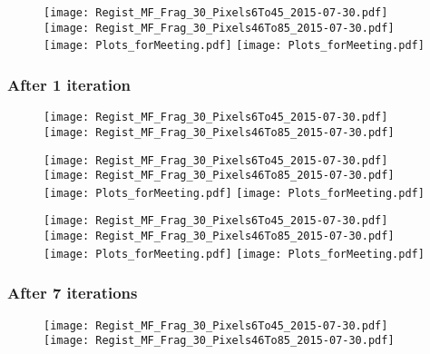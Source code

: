 \documentclass[10pt,dvipsnames,table]{beamer}
\begin{document}
\begin{frame}
\begin{figure}
\texttt{[image: Regist\_MF\_Frag\_30\_Pixels6To45\_2015-07-30.pdf]}
\texttt{[image: Regist\_MF\_Frag\_30\_Pixels46To85\_2015-07-30.pdf]} \\
\texttt{[image: Plots\_forMeeting.pdf]}
\texttt{[image: Plots\_forMeeting.pdf]}
\end{figure}
\end{frame}

\begin{frame}
\frametitle{After 1 iteration}
\begin{figure}
\texttt{[image: Regist\_MF\_Frag\_30\_Pixels6To45\_2015-07-30.pdf]}
\texttt{[image: Regist\_MF\_Frag\_30\_Pixels46To85\_2015-07-30.pdf]} \\
\end{figure}
\end{frame}

\begin{frame}
\begin{figure}
\texttt{[image: Regist\_MF\_Frag\_30\_Pixels6To45\_2015-07-30.pdf]}
\texttt{[image: Regist\_MF\_Frag\_30\_Pixels46To85\_2015-07-30.pdf]} \\
\texttt{[image: Plots\_forMeeting.pdf]}
\texttt{[image: Plots\_forMeeting.pdf]}
\end{figure}
\end{frame}

\begin{frame}
\begin{figure}
\texttt{[image: Regist\_MF\_Frag\_30\_Pixels6To45\_2015-07-30.pdf]}
\texttt{[image: Regist\_MF\_Frag\_30\_Pixels46To85\_2015-07-30.pdf]} \\
\texttt{[image: Plots\_forMeeting.pdf]}
\texttt{[image: Plots\_forMeeting.pdf]}
\end{figure}
\end{frame}

\begin{frame}
\frametitle{After 7 iterations}
\begin{figure}
\texttt{[image: Regist\_MF\_Frag\_30\_Pixels6To45\_2015-07-30.pdf]}
\texttt{[image: Regist\_MF\_Frag\_30\_Pixels46To85\_2015-07-30.pdf]} \\
\end{figure}
\end{frame}
\end{document}
